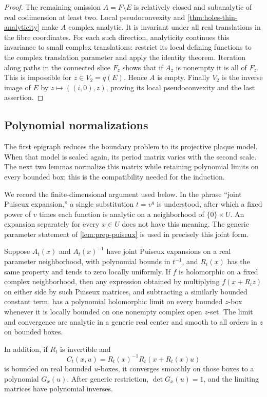 \begin{proof}
The remaining omission $A=F\setminus E$ is relatively closed and subanalytic of real codimension at least two.  Local pseudoconvexity and \cref{thm:holes-thin-analyticity} make $A$ complex analytic. It is invariant under all real translations in the fibre coordinates. For each such direction, analyticity continues this invariance to small complex translations: restrict its local defining functions to the complex translation parameter and apply the identity theorem. Iteration along paths in the connected slice $F_z$ shows that if $A_z$ is nonempty it is all of $F_z$.  This is impossible for $z\in V_2=q(E)$.  Hence $A$ is empty.  Finally $V_2$ is the inverse image of $E$ by $z\mapsto((i,0),z)$, proving its local pseudoconvexity and the last assertion.
\end{proof}

\subsection{Polynomial normalizations}

The first epigraph reduces the boundary problem to its projective plaque model. When that model is scaled again, its period matrix varies with the second scale. The next two lemmas normalize this matrix while retaining polynomial limits on every bounded box; this is the compatibility needed for the induction.

We record the finite-dimensional argument used below.  In the phrase ``joint Puiseux expansion,'' a single substitution $t=v^q$ is understood, after which a fixed power of $v$ times each function is analytic on a neighborhood of $\{0\}\times U$.  An expansion separately for every $x\in U$ does not have this meaning.  The generic parameter statement of \cref{lem:prep-puiseux} is used in precisely this joint form.

\begin{lemma}\label{lem:win-finite-taylor}
Suppose $A_t(x)$ and $A_t(x)^{-1}$ have joint Puiseux expansions on a real parameter neighborhood, with polynomial bounds in $t^{-1}$, and $R_t(x)$ has the same property and tends to zero locally uniformly. If $f$ is holomorphic on a fixed complex neighborhood, then any expression obtained by multiplying $f(x+R_tz)$ on either side by such Puiseux matrices, and subtracting a similarly bounded constant term, has a polynomial holomorphic limit on every bounded $z$-box whenever it is locally bounded on one nonempty complex open $z$-set.  The limit and convergence are analytic in a generic real center and smooth to all orders in $z$ on bounded boxes.

In addition, if $R_t$ is invertible and
\[
       C_t(x,u)=R_t(x)^{-1}R_t(x+R_t(x)u)
\]
is bounded on real bounded $u$-boxes, it converges smoothly on those boxes to a polynomial $G_x(u)$.  After generic restriction, $\det G_x(u)=1$, and the limiting matrices have polynomial inverses.
\end{lemma}

